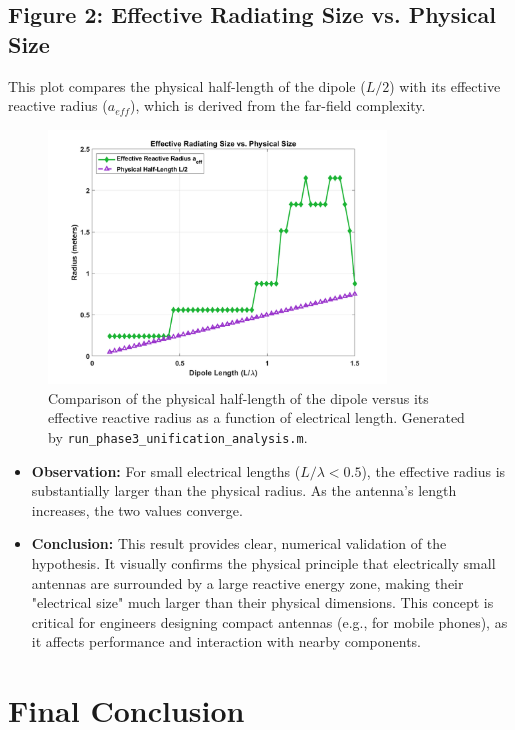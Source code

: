 \documentclass[11pt, a4paper]{article}
\begin{document}
\subsection{Figure 2: Effective Radiating Size vs. Physical Size}
This plot compares the physical half-length of the dipole ($L/2$) with its effective reactive radius ($a_{eff}$), which is derived from the far-field complexity.

\begin{figure}[H]
    \centering
    \includegraphics[width=0.8\textwidth]{Fig_Phase3_Size_Comparison.png}
    \caption{Comparison of the physical half-length of the dipole versus its effective reactive radius as a function of electrical length. Generated by \texttt{run\_phase3\_unification\_analysis.m}.}
    \label{fig:size}
\end{figure}

\begin{itemize}
    \item \textbf{Observation:} For small electrical lengths ($L/\lambda < 0.5$), the effective radius is substantially larger than the physical radius. As the antenna's length increases, the two values converge.
    \item \textbf{Conclusion:} This result provides clear, numerical validation of the hypothesis. It visually confirms the physical principle that electrically small antennas are surrounded by a large reactive energy zone, making their "electrical size" much larger than their physical dimensions. This concept is critical for engineers designing compact antennas (e.g., for mobile phones), as it affects performance and interaction with nearby components.
\end{itemize}

\section{Final Conclusion}
\end{document}
